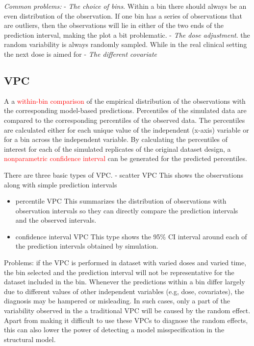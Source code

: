 \documentclass[
]{book}
\begin{document}
\emph{Common problems:}
- \emph{The choice of bins}. Within a bin there should always be an even distribution of the observation. If one bin has a series of observations that are outliers, then the observations will lie in either of the two ends of the prediction interval, making the plot a bit problematic.
- \emph{The dose adjustment}. the random variability is always randomly sampled. While in the real clinical setting the next dose is aimed for
- \emph{The different covariate}

\hypertarget{vpc}{%
\subsection{VPC}\label{vpc}}

A a \textcolor{red}{within-bin comparison} of the empirical distribution of the observations with the corresponding model-based predictions. Percentiles of the simulated data are compared to the corresponding percentiles of the observed data. The percentiles are calculated either for each unique value of the independent (x-axis) variable or for a bin across the independent variable. By calculating the percentiles of interest for each of the simulated replicates of the original dataset design, a \textcolor{red}{nonparametric confidence interval} can be generated for the predicted percentiles.

There are three basic types of VPC.
- scatter VPC
This shows the observations along with simple prediction intervals

\begin{itemize}
\item
  percentile VPC
  This summarizes the distribution of observations with observation intervals so they can directly compare the prediction intervals and the observed intervals.
\item
  confidence interval VPC
  This type shows the 95\% CI interval around each of the prediction intervals obtained by simulation.
\end{itemize}

Problems: if the VPC is performed in dataset with varied doses and varied time, the bin selected and the prediction interval will not be representative for the dataset included in the bin. Whenever the predictions within a bin differ largely due to different values of other independent variables (e.g, dose, covariates), the diagnosis may be hampered or misleading. In such cases, only a part of the variability observed in the a traditional VPC will be caused by the random effect. Apart from making it difficult to use these VPCs to diagnose the random effects, this can also lower the power of detecting a model misspecification in the structural model.
\end{document}
